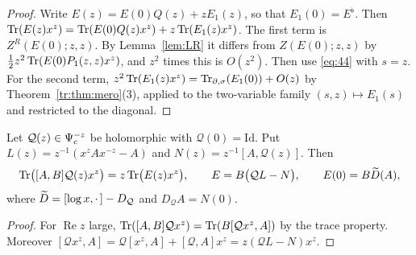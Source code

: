 \begin{proof}
Write \(E(z)=E(0)Q(z)+zE_1(z)\), so that \(E_1(0)=E^\flat\). Then
\(\operatorname{Tr}(E(z)x^z)=\operatorname{Tr}(E(0)Q(z)x^z)+z\operatorname{Tr}(E_1(z)x^z)\). The first term is
\(Z^R(E(0);z,z)\). By Lemma~\ref{lem:LR} it differs from \(Z(E(0);z,z)\) by
\(\frac12z^2\operatorname{Tr}(E(0)P_1(z,z)x^z)\), and \(z^2\) times this is \(O(z^2)\).
Then use \eqref{eq:44} with \(s=z\). For the second term,
\(z^2\operatorname{Tr}(E_1(z)x^z)=\operatorname{Tr}_{\partial,\sigma}(E_1(0))+O(z)\) by
Theorem~\ref{tr:thm:mero}(3), applied to the two-variable family
\((s,z)\mapsto E_1(s)\) and restricted to the diagonal.
\end{proof}

\begin{lemma}\label{tr:lem:commexp}
Let \(\mathcal Q(z)\in\Psi_{c}^{-z}\) be holomorphic with
\(\mathcal Q(0)=\mathrm{Id}\). Put \(L(z)=z^{-1}(x^zAx^{-z}-A)\) and
\(N(z)=z^{-1}[A,\mathcal Q(z)]\). Then
\[
 \operatorname{Tr}\bigl([A,B]\mathcal Q(z)x^z\bigr)=z\operatorname{Tr}\bigl(E(z)x^z\bigr),\qquad
 E=B\bigl(\mathcal QL-N\bigr),\qquad E(0)=B\widetilde D(A),
\]
where \(\widetilde D=[\log x,\cdot\,]-D_{\mathcal Q}\) and
\(D_{\mathcal Q}A=N(0)\).
\end{lemma}

\begin{proof}
For \(\operatorname{Re}z\) large, \(\operatorname{Tr}([A,B]\mathcal Qx^z)=
\operatorname{Tr}(B[\mathcal Qx^z,A])\) by the trace property. Moreover
\([\mathcal Qx^z,A]=\mathcal Q[x^z,A]+[\mathcal Q,A]x^z=z(\mathcal QL-N)x^z\).
\end{proof}

